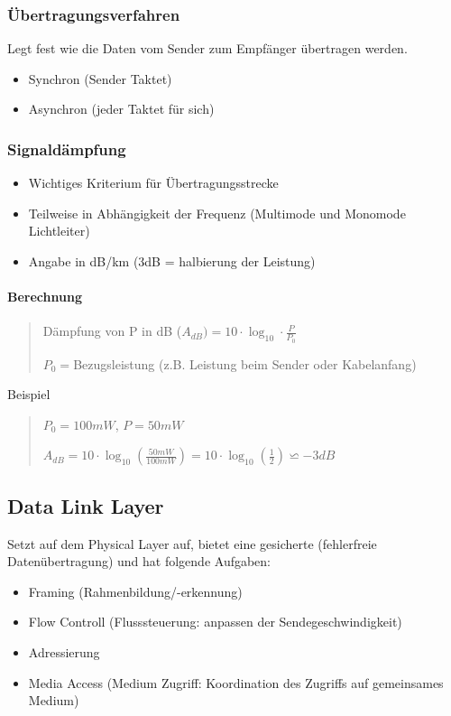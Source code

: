 \subsubsection*{Übertragungsverfahren}

Legt fest wie die Daten vom Sender zum Empfänger übertragen werden.
\begin{itemize}
\item Synchron (Sender Taktet)
\item Asynchron (jeder Taktet für sich)
\end{itemize}

\subsubsection*{Signaldämpfung}
\begin{itemize}
\item Wichtiges Kriterium für Übertragungsstrecke
\item Teilweise in Abhängigkeit der Frequenz (Multimode und Monomode Lichtleiter)
\item Angabe in dB/km (3dB = halbierung der Leistung)
\end{itemize}

\paragraph*{Berechnung}
\begin{verse}
Dämpfung von P in dB ($A_{dB})=10\cdot\log_{10}\cdot\frac{P}{P_{0}}$

$P_{0}=$Bezugsleistung (z.B. Leistung beim Sender oder Kabelanfang)
\end{verse}
Beispiel
\begin{verse}
$P_{0}=100mW$, $P=50mW$

$A_{dB}=10\cdot\log_{10}(\frac{50mW}{100mW})=10\cdot\log_{10}(\frac{1}{2})\backsimeq-3dB$
\end{verse}

\subsection*{Data Link Layer}

Setzt auf dem Physical Layer auf, bietet eine gesicherte (fehlerfreie
Datenübertragung) und hat folgende Aufgaben:
\begin{itemize}
\item Framing (Rahmenbildung/-erkennung)
\item Flow Controll (Flusssteuerung: anpassen der Sendegeschwindigkeit)
\item Adressierung
\item Media Access (Medium Zugriff: Koordination des Zugriffs auf gemeinsames
Medium)
\end{itemize}

